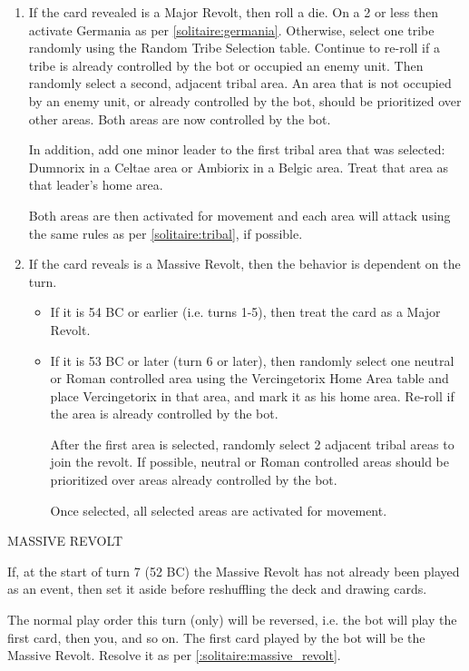 \begin{enumerate}
\begin{enumerate}[leftmargin=0in]
    \item If the card revealed is a Major Revolt, then roll a die. On a 2 or less then activate Germania as per \ref{solitaire:germania}. Otherwise, select one tribe randomly using the Random Tribe Selection table. Continue to re-roll if a tribe is already controlled by the bot or occupied an enemy unit. Then randomly select a second, adjacent tribal area. An area that is not occupied by an enemy unit, or already controlled by the bot, should be prioritized over other areas. Both areas are now controlled by the bot.
  
    In addition, add one minor leader to the first tribal area that was selected: Dumnorix in a Celtae area or Ambiorix in a Belgic area. Treat that area as that leader's home area.
  
    Both areas are then activated for movement and each area will attack using the same rules as per \ref{solitaire:tribal}, if possible.
  
    \item If the card reveals is a Massive Revolt, then the behavior is dependent on the turn.
    \begin{itemize}
      \item If it is 54 BC or earlier (i.e. turns 1-5), then treat the card as a Major Revolt.
      \item \label{:solitaire:massive_revolt}If it is 53 BC or later (turn 6 or later), then randomly select one neutral or Roman controlled area using the Vercingetorix Home Area table and place Vercingetorix in that area, and mark it as his home area. Re-roll if the area is already controlled by the bot.
      
      After the first area is selected, randomly select 2 adjacent tribal areas to join the revolt. If possible, neutral or Roman controlled areas should be prioritized over areas already controlled by the bot.
      
      Once selected, all selected areas are activated for movement.
    \end{itemize}
  \end{enumerate}
\end{enumerate}
  
MASSIVE REVOLT

If, at the start of turn 7 (52 BC) the Massive Revolt has not already been played as an event, then set it aside before reshuffling the deck and drawing cards.
  
The normal play order this turn (only) will be reversed, i.e. the bot will play the first card, then you, and so on. The first card played by the bot will be the Massive Revolt. Resolve it as per \ref{:solitaire:massive_revolt}.
  
